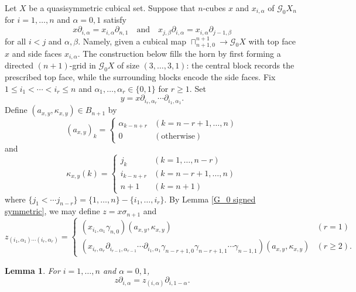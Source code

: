 \documentclass[oneside, 12pt]{amsart}
\numberwithin{equation}{section}
\theoremstyle{plain}
\newtheorem{lemma}[theorem]{Lemma}
\theoremstyle{definition}
\theoremstyle{remark}
\begin{document}
	
	
	Let $X$ be a quasisymmetric cubical set. Suppose that $n$-cubes $x$ and $x_{i,\alpha}$ of $\mathcal{G}_0X_n$ for $i=1,\ldots,n$ and $\alpha=0,1$ satisfy
	\[
	x\partial_{i,\alpha}=x_{i,\alpha}\partial_{n,1}\quad\text{and}\quad x_{j,\beta}\partial_{i,\alpha}=x_{i,\alpha}\partial_{j-1,\beta}
	\]
	for all $i<j$ and $\alpha,\beta$. Namely, given a cubical map $\sqcap_{n+1,0}^{n+1}\to\mathcal{G}_0X$ with top face $x$ and side faces $x_{i,\alpha}$. The construction below fills the horn by first forming a directed $(n+1)$-grid in $\mathcal{G}_0X$ of size $(3,\ldots,3,1)$: the central block records the prescribed top face, while the surrounding blocks encode the side faces. Fix $1\le i_1<\cdots<i_r\le n$ and $\alpha_1,\ldots,\alpha_r\in\{0,1\}$ for $r\ge 1$. Set
	\[
	y=x\partial_{i_r,\alpha_r}\cdots\partial_{i_1,\alpha_1}.
	\]
	Define $(a_{x,y},\kappa_{x,y})\in B_{n+1}$ by
	\begin{equation}
		\label{axy}
		(a_{x,y})_k=
		\begin{cases}
			\alpha_{k-n+r}&(k=n-r+1,\ldots,n)\\
			0&(\text{otherwise})
		\end{cases}
	\end{equation}
	and
	\begin{equation}
		\label{kappaxy}
		\kappa_{x,y}(k)=
		\begin{cases}
			j_k&(k=1,\ldots,n-r)\\
			i_{k-n+r}&(k=n-r+1,\ldots,n)\\
			n+1&(k=n+1)
		\end{cases}
	\end{equation}
	where $\{j_1<\cdots j_{n-r}\}=\{1,\ldots,n\}-\{i_1,\ldots,i_r\}$. By Lemma \ref{G_0 signed symmetric}, we may define $z=x\sigma_{n+1}$ and
	\[
	z_{(i_1,\alpha_1)\cdots(i_r,\alpha_r)}=
	\begin{cases}
		(x_{i_1,\alpha_1}\gamma_{n,0})(a_{x,y},\kappa_{x,y})&(r=1)\\
		(x_{i_r,\alpha_r}\partial_{i_{r-1},\alpha_{r-1}}\cdots\partial_{i_1,\alpha_1}\gamma_{n-r+1,0}\gamma_{n-r+1,1}\cdots\gamma_{n-1,1})(a_{x,y},\kappa_{x,y})&(r\ge 2).
	\end{cases}
	\]
	
	
	
	\begin{lemma}
		\label{top face}
		For $i=1,\ldots,n$ and $\alpha=0,1$,
		\[
		z\partial_{i,\alpha}=z_{(i,\alpha)}\partial_{i,1-\alpha}.
		\]
	\end{lemma}
	
\end{document}
